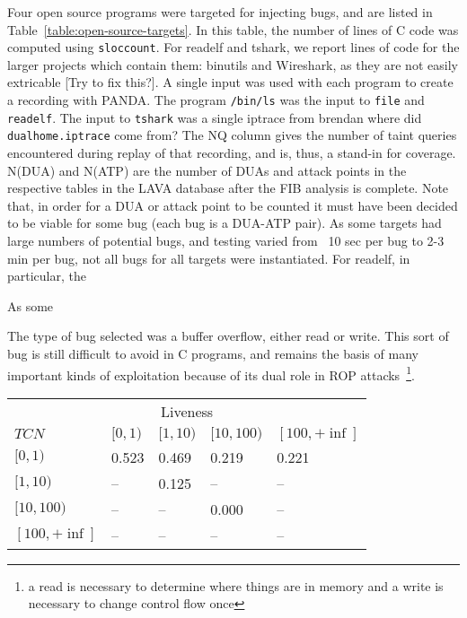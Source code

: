 Four open source programs were targeted for injecting bugs, and are listed in Table~\ref{table:open-source-targets}.
In this table, the number of lines of C code was computed using \verb+sloccount+.  
For readelf and tshark, we report lines of code for the larger projects which contain them: binutils and Wireshark, as they are not easily extricable [Try to fix this?].
A single input was used with each program to create a recording with PANDA.
The program \verb+/bin/ls+ was the input to \verb+file+ and \verb+readelf+.
The input to \verb+tshark+ was a single iptrace from brendan where did \verb+dualhome.iptrace+ come from? 
The NQ column gives the number of taint queries encountered during replay of that recording, and is, thus, a stand-in for coverage. 
N(DUA) and N(ATP) are the number of DUAs and attack points in the respective tables in the LAVA database after the FIB analysis is complete.
Note that, in order for a DUA or attack point to be counted it must have been decided to be viable for some bug (each bug is a DUA-ATP pair).
As some targets had large numbers of potential bugs, and testing varied from ~10 sec per bug to 2-3 min per bug, not all bugs for
all targets were instantiated.  
For readelf, in particular, the 

As some 

The type of bug selected was a buffer overflow, either read or write.
This sort of bug is still difficult to avoid in C programs, and remains the basis of many important kinds of exploitation because of its dual role in ROP attacks~\footnote{a read is necessary to determine where things are in memory and a write is necessary to change control flow once}.







\begin{table}
\centering
\begin{tabular}{l|l|l|l|l} 
 & \multicolumn{3}{c}{Liveness} &  \\  
$TCN$ &         $[0,1)$ & $[1,10)$ & $[10,100)$ & $[100,+\inf]$ \\  \hline 
$[0,1)$ &       0.523   & 0.469    & 0.219      & 0.221 \\
$[1,10)$ &      --      & 0.125    & --         & --    \\
$[10,100)$ &    --      & --       & 0.000      & --    \\
$[100,+\inf]$ & --      & --       & --         & -- \\ 
\end{tabular}
\end{table}



